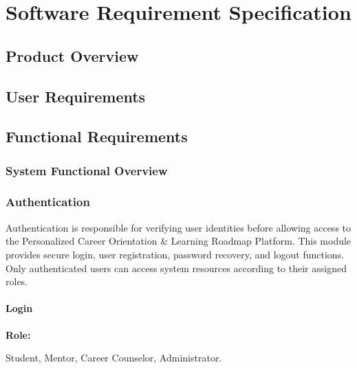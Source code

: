 \chapter{Software Requirement Specification}

\section{Product Overview}


\section{User Requirements}


\section{Functional Requirements}


\subsection{System Functional Overview}


\subsection{Authentication}

Authentication is responsible for verifying user identities before allowing access to the Personalized Career Orientation \& Learning Roadmap Platform. This module provides secure login, user registration, password recovery, and logout functions. Only authenticated users can access system resources according to their assigned roles.

\subsubsection{Login}

\textbf{Role:}

Student, Mentor, Career Counselor, Administrator.

\vspace{0.3cm}

